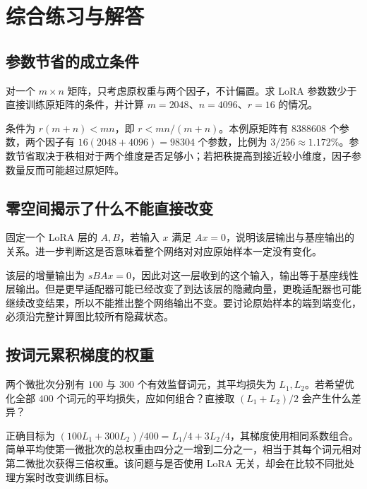 \documentclass[UTF8,12pt,a4paper,fontset=fandol]{ctexart}
\begin{document}
\section{综合练习与解答}
\label{sec:exercises}

\subsection{参数节省的成立条件}

\begin{example}
对一个 $m\times n$ 矩阵，只考虑原权重与两个因子，不计偏置。求 LoRA 参数数少于直接训练原矩阵的条件，并计算 $m=2048$、$n=4096$、$r=16$ 的情况。
\end{example}
\begin{solve}
条件为 $r(m+n)<mn$，即 $r<mn/(m+n)$。本例原矩阵有 $8388608$ 个参数，两个因子有
$16(2048+4096)=98304$ 个参数，比例为 $3/256\approx1.172\%$。参数节省取决于秩相对于两个维度是否足够小；若把秩提高到接近较小维度，因子参数量反而可能超过原矩阵。
\end{solve}

\subsection{零空间揭示了什么不能直接改变}

\begin{example}
固定一个 LoRA 层的 $A,B$，若输入 $x$ 满足 $Ax=0$，说明该层输出与基座输出的关系。进一步判断这是否意味着整个网络对对应原始样本一定没有变化。
\end{example}
\begin{solve}
该层的增量输出为 $sBAx=0$，因此对这一层收到的这个输入，输出等于基座线性层输出。但是更早适配器可能已经改变了到达该层的隐藏向量，更晚适配器也可能继续改变结果，所以不能推出整个网络输出不变。要讨论原始样本的端到端变化，必须沿完整计算图比较所有隐藏状态。
\end{solve}

\subsection{按词元累积梯度的权重}

\begin{example}
两个微批次分别有 $100$ 与 $300$ 个有效监督词元，其平均损失为 $L_1,L_2$。若希望优化全部 $400$ 个词元的平均损失，应如何组合？直接取 $(L_1+L_2)/2$ 会产生什么差异？
\end{example}
\begin{solve}
正确目标为 $(100L_1+300L_2)/400=L_1/4+3L_2/4$，其梯度使用相同系数组合。简单平均使第一微批次的总权重由四分之一增到二分之一，相当于其每个词元相对第二微批次获得三倍权重。该问题与是否使用 LoRA 无关，却会在比较不同批处理方案时改变训练目标。
\end{solve}
\end{document}

